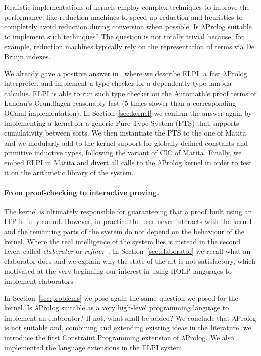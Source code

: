 \documentclass{easychair}
\begin{document}
Realistic implementations of kernels employ complex techniques to improve the performance, like reduction machines to speed up reduction and heuristics to completely avoid reduction during conversion when possible. Is $\lambda$Prolog suitable to implement such techniques? The question is not totally trivial because, for example, reduction machines typically rely on the representation of terms via De Bruijn indexes.

We already gave a positive answer in~\cite{elpiLPAR} where we describe
ELPI, a fast $\lambda$Prolog interpreter, and implement 
a type-checker for a dependently type lambda calculus.
ELPI is able to run such type checker on the Automath's proof terms of
Landau's Grundlagen reasonably fast (5 times slower than a corresponding OCaml implementation).
In Section~\ref{sec:kernel} we confirm the answer again by implementing a
kernel for a generic Pure Type System (PTS) that supports cumulativity between
sorts. We then instantiate the PTS to the one of Matita and we
modularly add to the kernel support for globally defined constants and
primitive inductive types, following the variant of CIC of Matita. Finally, we embed ELPI in Matita and divert all calls
to the $\lambda$Prolog kernel in order to test it on the arithmetic
library of the system.

\paragraph{From proof-checking to interactive proving.}

The kernel is ultimately responsible for guaranteeing that a proof
built using an ITP is fully sound. However, in practice the user never
interacts with the kernel and the remaining parts of the system do not
depend on the behaviour of the kernel. Where the real intelligence of
the system lies is instead in the second layer, called \emph{elaborator}
or \emph{refiner}~\cite{Lean,bidir}.
In Section~\ref{sec:elaborator} we recall what an elaborator does and we explain why the state of the art is not satisfactory, which motivated at the very beginning our interest in using HOLP languages to implement elaborators

In Section~\ref{sec:problems} we pose again the same question we posed for the kernel. Is $\lambda$Prolog suitable as a very high-level programming language to implement an elaborator? If not, what shall be added? We conclude that $\lambda$Prolog is not suitable and, combining and extending existing ideas in the literature, we introduce the first Constraint Programming extension of $\lambda$Prolog. We also implemented the language extensions in the ELPI system.
\end{document}
